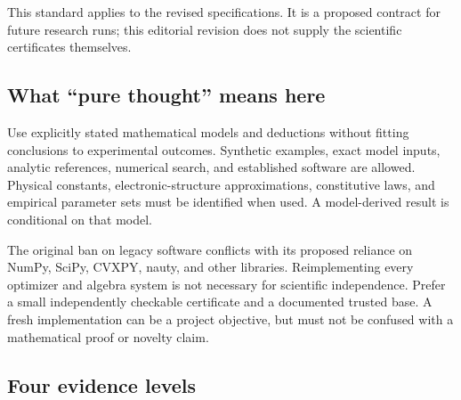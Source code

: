 \documentclass[
  11pt,
]{article}
\begin{document}
This standard applies to the revised specifications. It is a proposed
contract for future research runs; this editorial revision does not
supply the scientific certificates themselves.

\subsection{What ``pure thought'' means here}

Use explicitly stated mathematical models and deductions without fitting
conclusions to experimental outcomes. Synthetic examples, exact model
inputs, analytic references, numerical search, and established software
are allowed. Physical constants, electronic-structure approximations,
constitutive laws, and empirical parameter sets must be identified when
used. A model-derived result is conditional on that model.

The original ban on legacy software conflicts with its proposed reliance
on NumPy, SciPy, CVXPY, nauty, and other libraries. Reimplementing every
optimizer and algebra system is not necessary for scientific
independence. Prefer a small independently checkable certificate and a
documented trusted base. A fresh implementation can be a project
objective, but must not be confused with a mathematical proof or novelty
claim.

\subsection{Four evidence levels}
\end{document}
